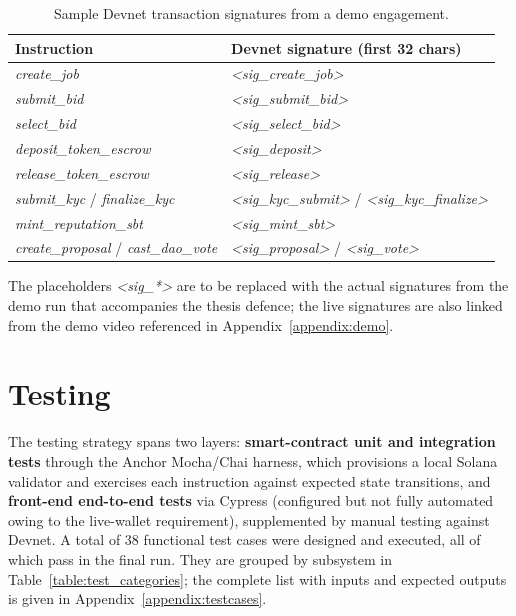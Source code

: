 \begin{table}[H]
\centering
\caption{Sample Devnet transaction signatures from a demo engagement.}
\label{table:tx_samples}
\small
\begin{tabular}{|l|p{8cm}|}
\hline
\textbf{Instruction} & \textbf{Devnet signature (first 32 chars)} \\ \hline
\emph{create\_job} & \emph{\textless{}sig\_create\_job\textgreater{}} \\ \hline
\emph{submit\_bid} & \emph{\textless{}sig\_submit\_bid\textgreater{}} \\ \hline
\emph{select\_bid} & \emph{\textless{}sig\_select\_bid\textgreater{}} \\ \hline
\emph{deposit\_token\_escrow} & \emph{\textless{}sig\_deposit\textgreater{}} \\ \hline
\emph{release\_token\_escrow} & \emph{\textless{}sig\_release\textgreater{}} \\ \hline
\emph{submit\_kyc} / \emph{finalize\_kyc} & \emph{\textless{}sig\_kyc\_submit\textgreater{}} / \emph{\textless{}sig\_kyc\_finalize\textgreater{}} \\ \hline
\emph{mint\_reputation\_sbt} & \emph{\textless{}sig\_mint\_sbt\textgreater{}} \\ \hline
\emph{create\_proposal} / \emph{cast\_dao\_vote} & \emph{\textless{}sig\_proposal\textgreater{}} / \emph{\textless{}sig\_vote\textgreater{}} \\ \hline
\end{tabular}
\end{table}

\noindent The placeholders \emph{\textless{}sig\_*\textgreater{}} are to be replaced with the actual signatures from the demo run that accompanies the thesis defence; the live signatures are also linked from the demo video referenced in Appendix~\ref{appendix:demo}.

\section{Testing}
\label{section:4.4}

The testing strategy spans two layers: \textbf{smart-contract unit and integration tests} through the Anchor Mocha/Chai harness, which provisions a local Solana validator and exercises each instruction against expected state transitions, and \textbf{front-end end-to-end tests} via Cypress (configured but not fully automated owing to the live-wallet requirement), supplemented by manual testing against Devnet. A total of 38 functional test cases were designed and executed, all of which pass in the final run. They are grouped by subsystem in Table~\ref{table:test_categories}; the complete list with inputs and expected outputs is given in Appendix~\ref{appendix:testcases}.

